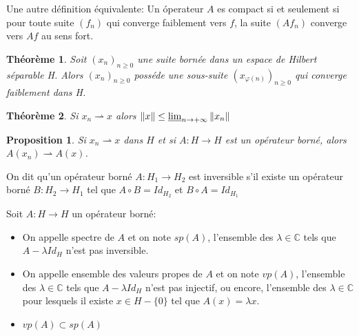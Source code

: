 \documentclass[10pt,a4paper,oneside]{article}
\newtheorem{theoreme}{Théorème}
\newtheorem{proposition}{Proposition}
\newenvironment{definition}[1][Definition]{\begin{trivlist}
\item[\hskip \labelsep {\bfseries #1}]}{\end{trivlist}}
\newenvironment{remarque}[1][Remarque]{\begin{trivlist}
\item[\hskip \labelsep {\bfseries #1}]}{\end{trivlist}}
\begin{document}
\begin{remarque}
Une autre définition équivalente: Un óperateur $A$ es compact si et seulement si pour toute suite $(f_n)$ qui converge faiblement vers $f$, la suite $(Af_n)$ converge vers $Af$ au sens fort.
\end{remarque}

\begin{theoreme}
Soit $(x_n)_{n\geq0}$ une suite bornée dans un espace de Hilbert séparable H. Alors $(x_n)_{n\geq0}$ posséde une sous-suite $(x_{\varphi(n)})_{n\geq0}$ qui converge faiblement dans H.
\end{theoreme}


\begin{theoreme}
Si $x_n \rightharpoonup x$ alors $\| x \| \leq \varliminf_{n \to +\infty} \| x_n \|$
\end{theoreme}


\begin{proposition}
Si $x_n \rightharpoonup x$ dans $H$ et si $A: H \rightarrow H$ est un opérateur borné, alors $A(x_n) \rightharpoonup A(x)$.
\end{proposition}


\begin{definition}
On dit qu'un opérateur borné $A: H_{1} \rightarrow H_{2}$ est inversible s'il existe un opérateur borné $B: H_{2} \rightarrow H_{1}$ tel que $A \circ B = Id_{H_{2}}$ et $B \circ A = Id_{H_{1}}$
\end{definition}


\begin{definition}
Soit $A: H \rightarrow H$ un opérateur borné:

\begin{itemize}

\item
On appelle spectre de $A$  et on note $sp(A)$, l'ensemble des $\lambda \in \mathbb{C}$ tels que $A - \lambda Id_{H}$ n'est pas inversible.

\item
On appelle ensemble des valeurs propes de $A$ et on note $vp(A)$, l'ensemble des $\lambda \in \mathbb{C}$ tels que $A - \lambda Id_{H}$ n'est pas injectif, ou encore, l'ensemble des $\lambda \in \mathbb{C}$ pour lesquels il existe $x \in H - \{0\}$ tel que $A(x) = \lambda x$.

\item
$vp(A) \subset sp(A)$

\end{itemize}

\end{definition}
\end{document}
